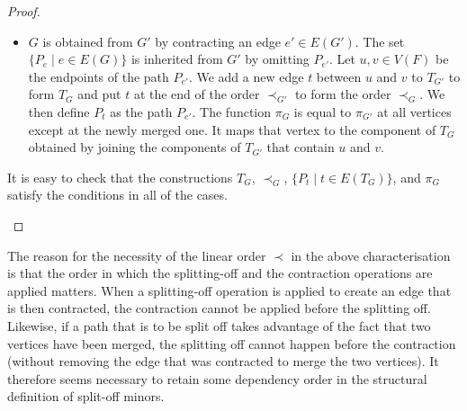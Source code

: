 \documentclass[11pt]{article}
\begin{document}
\begin{proof}
\begin{itemize}
\begin{itemize}
            \item $G$ is obtained from $G'$ by contracting an edge $e' \in E(G')$. The set $\{P_e \mid e \in E(G)\}$ is inherited from $G'$ by omitting $P_{e'}$. Let $u,v \in V(F)$ be the endpoints of the path $P_{e'}$. We add a new edge $t$ between $u$ and $v$ to $T_{G'}$ to form $T_G$ and put $t$ at the end of the order $\prec_{G'}$ to form the order $\prec_G$. We then define $P_t$ as the path $P_{e'}$.
            The function $\pi_G$ is equal to $\pi_{G'}$ at all vertices except at the newly merged one. It maps that vertex to the component of $T_{G}$ obtained by joining the components of $T_{G'}$ that contain $u$ and $v$.
        \end{itemize}
         It is easy to check that the constructions $T_{G}$, $\prec_G$, $\{P_t \mid t \in E(T_{G})\}$, and $\pi_{G}$ satisfy the conditions in all of the cases.
    \end{itemize}
\end{proof}
The reason for the necessity of the linear order $\prec$ in the above characterisation is that the order in which the splitting-off and the contraction operations are applied matters. When a splitting-off operation is applied to create an edge that is then contracted, the contraction cannot be applied before the splitting off. Likewise, if a path that is to be split off takes advantage of the fact that two vertices have been merged, the splitting off cannot happen before the contraction (without removing the edge that was contracted to merge the two vertices). It therefore seems necessary to retain some dependency order in the structural definition of split-off minors.
\end{document}
